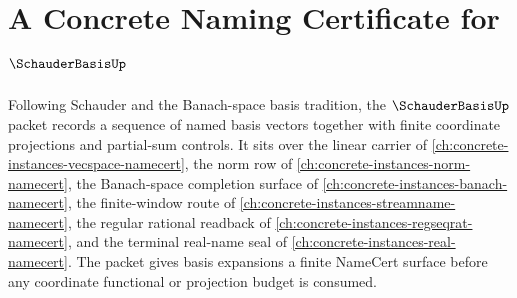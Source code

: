 \chapter{A Concrete Naming Certificate for $\SchauderBasisUp$}
\label{ch:concrete-instances-schauder-basis-namecert}

Following Schauder and the Banach-space basis tradition, the $\SchauderBasisUp$ packet records a sequence of named basis vectors together with finite coordinate projections and partial-sum controls. It sits over the linear carrier of \autoref{ch:concrete-instances-vecspace-namecert}, the norm row of \autoref{ch:concrete-instances-norm-namecert}, the Banach-space completion surface of \autoref{ch:concrete-instances-banach-namecert}, the finite-window route of \autoref{ch:concrete-instances-streamname-namecert}, the regular rational readback of \autoref{ch:concrete-instances-regseqrat-namecert}, and the terminal real-name seal of \autoref{ch:concrete-instances-real-namecert}. The packet gives basis expansions a finite NameCert surface before any coordinate functional or projection budget is consumed.

